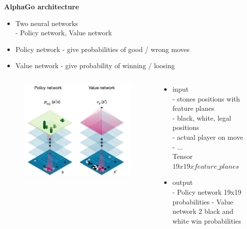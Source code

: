 \documentclass[xcolor=dvipsnames]{beamer}
\begin{document}
\begin{frame}{\bf AlphaGo architecture}


\begin{itemize}
    \item Two neural networks \\
    - Policy network, Value network
    \item Policy network - give probabilities of good / wrong moves
    \item Value network - give probability of winning / loosing
\end{itemize}

\begin{columns}
\begin{column}{0.5\textwidth}

\begin{figure}[!htb]
  \centering
  \includegraphics[scale=0.2]{../../pictures/alpha_go_architecture.png}
\end{figure}

\end{column}
\begin{column}{0.5\textwidth}  %

\begin{itemize}
    \item input \\
        {\footnotesize
        - stones positions with feature planes \\
        - black, white, legal positions \\
        - actual player on move \\
        - ... \\
        Tensor $19x19xfeature\_planes$
        }
    \item output \\
        - Policy network 19x19 probabilities
        - Value network 2 black and white win probabilities
\end{itemize}

\end{column}
\end{columns}

\end{frame}
\end{document}
